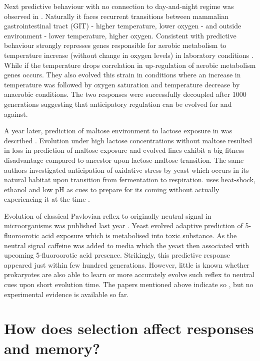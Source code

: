 Next predictive behaviour with no connection to day-and-night regime was observed in .
Naturally it faces recurrent transitions between mammalian gastrointestinal tract (GIT) - higher temperature, lower oxygen - and outside environment - lower temperature, higher oxygen.
Consistent with predictive behaviour  strongly represses genes responsible for aerobic metabolism to temperature increase (without change in oxygen levels) in laboratory conditions \cite{tagkopoulos2008predictive}.
While if the temperature drops correlation in up-regulation of aerobic metabolism genes occurs.
They also evolved this strain in conditions where an increase in temperature was followed by oxygen saturation and temperature decrease by anaerobic conditions.
The two responses were successfully decoupled after 1000 generations suggesting that anticipatory regulation can be evolved for and against.

A year later, prediction of maltose environment to lactose exposure in  was described \cite{mitchell2009adaptive}.
Evolution under high lactose concentrations without maltose resulted in loss in prediction of maltose exposure and evolved lines exhibit a big fitness disadvantage compared to ancestor upon lactose-maltose transition.
The same authors investigated anticipation of oxidative stress by yeast which occurs in its natural habitat upon transition from fermentation to respiration.
 uses heat-shock, ethanol and low pH as cues to prepare for its coming without actually experiencing it at the time \cite{mitchell2009adaptive}.

Evolution of classical Pavlovian reflex to originally neutral signal in microorganisms was published last year \cite{lopez2017adaptive}.
Yeast  evolved adaptive prediction of 5-fluoroorotic acid exposure which is metabolised into toxic substance.
As the neutral signal caffeine was added to media which the yeast then associated with upcoming 5-fluoroorotic acid presence.
Strikingly, this predictive response appeared just within few hundred generations.
However, little is known whether prokaryotes are also able to learn or more accurately evolve such reflex to neutral cues upon short evolution time.
The papers mentioned above indicate so \cite{tagkopoulos2008predictive, mitchell2009adaptive}, but no experimental evidence is available so far.


\section{How does selection affect responses and memory?}


